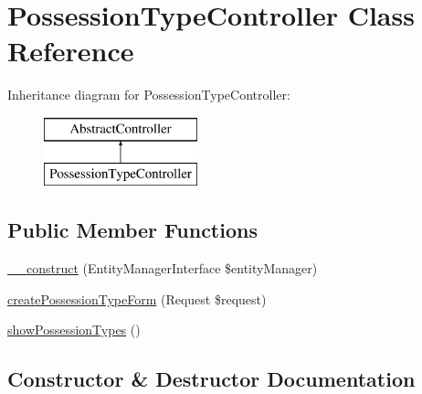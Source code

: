 \hypertarget{class_app_1_1_controller_1_1_possession_type_controller}{}\section{Possession\+Type\+Controller Class Reference}
\label{class_app_1_1_controller_1_1_possession_type_controller}
Inheritance diagram for Possession\+Type\+Controller\+:\begin{figure}[H]
\begin{center}
\leavevmode
\includegraphics[height=2.000000cm]{class_app_1_1_controller_1_1_possession_type_controller}
\end{center}
\end{figure}
\subsection*{Public Member Functions}
\begin{DoxyCompactItemize}
\item 
\mbox{\hyperlink{class_app_1_1_controller_1_1_possession_type_controller_abb5fb9a65dd8a81e7482dddbf71c5177}{\+\_\+\+\_\+construct}} (Entity\+Manager\+Interface \$entity\+Manager)
\item 
\mbox{\hyperlink{class_app_1_1_controller_1_1_possession_type_controller_ac7e770cc60caacc424e7996f3fb2946a}{create\+Possession\+Type\+Form}} (Request \$request)
\item 
\mbox{\hyperlink{class_app_1_1_controller_1_1_possession_type_controller_a2ad87a191efa444fffba6372f560bb95}{show\+Possession\+Types}} ()
\end{DoxyCompactItemize}


\subsection{Constructor \& Destructor Documentation}
\mbox{\label{class_app_1_1_controller_1_1_possession_type_controller_abb5fb9a65dd8a81e7482dddbf71c5177}} 
